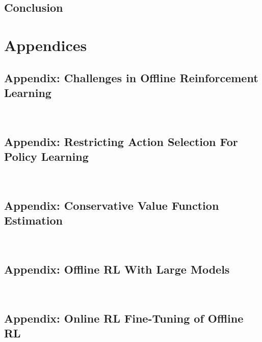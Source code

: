 \documentclass[letterpaper,12pt, oneside]{lib/ucthesis}
\begin{document}
\begin{dissertationText}
% 	

% 	
	
\chapter{Conclusion}
	


\part{Appendices}

\appendix

\chapter{Appendix: Challenges in Offline Reinforcement Learning}~\label{sec:appendix-challenges}
	

\chapter{Appendix: Restricting Action Selection For Policy Learning}~\label{sec:appendix-bear}
	

\chapter{Appendix: Conservative Value Function Estimation}~\label{sec:appendix-cql}


\chapter{Appendix: Offline RL With Large Models}~\label{sec:appendix-large}


\chapter{Appendix: Online RL Fine-Tuning of Offline RL}~\label{sec:appendix-calql}



\end{dissertationText}
\end{document}
